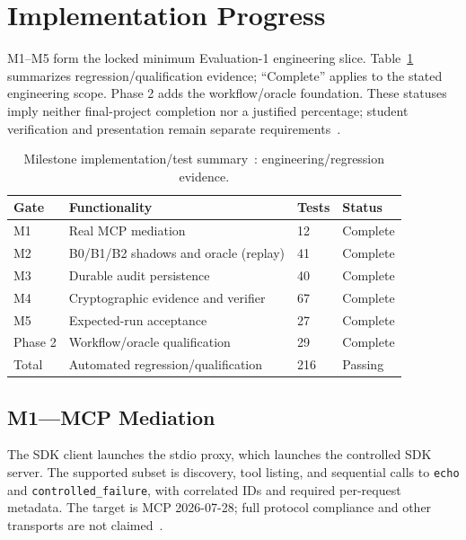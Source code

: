 \documentclass[conference]{IEEEtran}
\begin{document}
\section{Implementation Progress}
M1--M5 form the locked minimum Evaluation-1 engineering slice. Table~\ref{tab:milestones} summarizes regression/qualification evidence; ``Complete'' applies to the stated engineering scope. Phase 2 adds the workflow/oracle foundation. These statuses imply neither final-project completion nor a justified percentage; student verification and presentation remain separate requirements~\cite{cgresults}.

\begin{table}[t]
\centering
\caption{Milestone implementation/test summary~\cite{cgresults}: engineering/regression evidence.}
\label{tab:milestones}
\small
\setlength{\tabcolsep}{3pt}
\renewcommand{\arraystretch}{1.15}
\begin{tabular}{@{}p{}p{}p{}p{}@{}}
\toprule
Gate & Functionality & Tests & Status \\
\midrule
M1 & Real MCP mediation & 12 & Complete \\
M2 & B0/B1/B2 shadows and oracle (replay) & 41 & Complete \\
M3 & Durable audit persistence & 40 & Complete \\
M4 & Cryptographic evidence and verifier & 67 & Complete \\
M5 & Expected-run acceptance & 27 & Complete \\
Phase 2 & Workflow/oracle qualification & 29 & Complete \\
\midrule
Total & Automated regression/qualification & 216 & Passing \\
\bottomrule
\end{tabular}
\end{table}

\subsection{M1---MCP Mediation}
The SDK client launches the stdio proxy, which launches the controlled SDK server. The supported subset is discovery, tool listing, and sequential calls to \texttt{echo} and \texttt{controlled\_failure}, with correlated IDs and required per-request metadata. The target is MCP 2026-07-28; full protocol compliance and other transports are not claimed~\cite{cgresults}.
\end{document}
